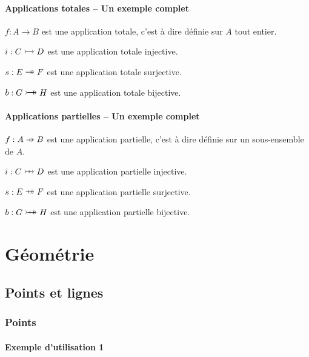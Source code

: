 \documentclass[12pt,a4paper]{article}
\theoremstyle{definition}
\begin{document}
\paragraph{Applications totales -- Un exemple complet}

\begin{latexex-flat}
$f: A \to B$ est une application totale, c'est à dire définie sur $A$ tout entier.

$i: C \onetoone D$ est une application totale injective.

$s: E \onto F$ est une application totale surjective.

$b: G \biject H$ est une application totale bijective.
\end{latexex-flat}




\paragraph{Applications partielles -- Un exemple complet}

\begin{latexex-flat}
$f: A \pto B$ est une application partielle, c'est à dire définie sur
un sous-ensemble de $A$.

$i: C \ponetoone D$ est une application partielle injective.

$s: E \ponto F$ est une application partielle surjective.

$b: G \pbiject H$ est une application partielle bijective.
\end{latexex-flat}


\section{Géométrie}

\subsection{Points et lignes}

\subsubsection{Points}

\paragraph{Exemple d'utilisation 1}
\end{document}
